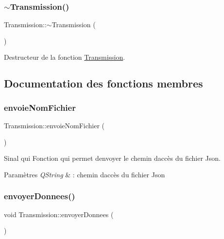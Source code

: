 \subsubsection{\texorpdfstring{$\sim$\+Transmission()}{~Transmission()}}
{\footnotesize\ttfamily Transmission\+::$\sim$\+Transmission (\begin{DoxyParamCaption}{ }\end{DoxyParamCaption})}



Destructeur de la fonction \hyperlink{classTransmission}{Transmission}. 



\subsection{Documentation des fonctions membres}
\mbox{\label{classTransmission_abf18bf1963c75b06b1e437bec51de35e}} 
\subsubsection{\texorpdfstring{envoie\+Nom\+Fichier}{envoieNomFichier}}
{\footnotesize\ttfamily Transmission\+::envoie\+Nom\+Fichier (\begin{DoxyParamCaption}\item[{Q\+String}]{ }\end{DoxyParamCaption})\hspace{0.3cm}{\ttfamily [signal]}}



Sinal qui Fonction qui permet d\textquotesingle{}envoyer le chemin d\textquotesingle{}accès du fichier Json. 


\begin{DoxyParams}{Paramètres}
{\em Q\+String} & \+: chemin d\textquotesingle{}accès du fichier Json \\
\hline
\end{DoxyParams}
\mbox{\label{classTransmission_a14b885539e973a158c9c4c25fd99bc04}} 
\subsubsection{\texorpdfstring{envoyer\+Donnees()}{envoyerDonnees()}}
{\footnotesize\ttfamily void Transmission\+::envoyer\+Donnees (\begin{DoxyParamCaption}{ }\end{DoxyParamCaption})\hspace{0.3cm}{\ttfamily [private]}}



